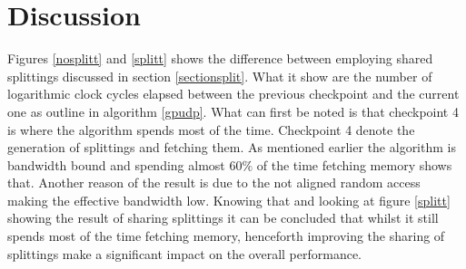 \documentclass{llncs}
\begin{document}
%
%
%
% 
%
%
%
\section{Discussion} %
Figures \ref{nosplitt} and \ref{splitt} shows the difference between employing 
shared splittings discussed in section \ref{sectionsplit}. 
What it show are the number of logarithmic clock cycles elapsed between the 
previous checkpoint and the current one as outline in algorithm \ref{gpudp}.
What can first be noted is that checkpoint 4 is where the algorithm spends most of the time. 
Checkpoint 4 denote the generation of splittings and fetching them.
As mentioned earlier the algorithm is bandwidth bound and spending almost
$60\%$ of the time fetching memory shows that. Another reason of the result
is due to the not aligned random access making the effective bandwidth low.
Knowing that and looking at figure \ref{splitt} showing the result of sharing splittings it can be concluded that whilst it still spends most 
of the time fetching memory, henceforth improving the sharing of splittings make a significant impact on the overall performance.
\end{document}
